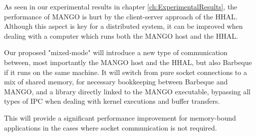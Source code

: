 As seen in our experimental results in chapter \ref{ch:ExperimentalResults}, the performance of MANGO is hurt by the client-server approach of the HHAL. Although this aspect is key for a distributed system, it can be improved when dealing with a computer which runs both the MANGO host and the HHAL. 

Our proposed "mixed-mode" will introduce a new type of communication between, most importantly the MANGO host and the HHAL, but also Barbeque if it runs on the same machine. It will switch from pure socket connections to a mix of shared memory, for necessary bookkeeping between Barbeque and MANGO, and a library directly linked to the MANGO executable, bypassing all types of IPC when dealing with kernel executions and buffer transfers.

This will provide a significant performance improvement for memory-bound applications in the cases where socket communication is not required.
